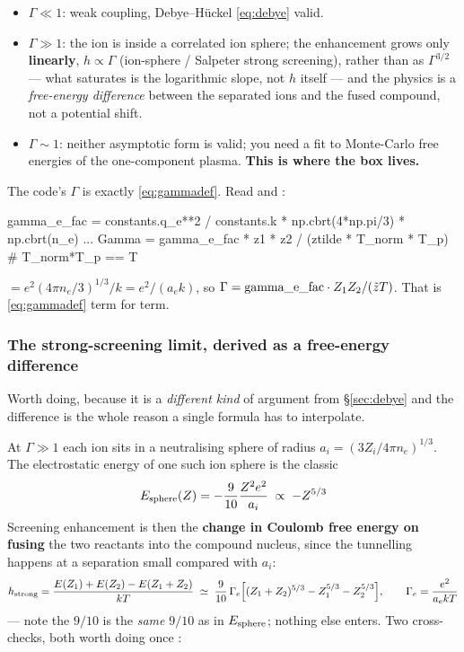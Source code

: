 \begin{itemize}
\item \textbf{$\Gamma \ll 1$}: weak coupling, Debye--H\"uckel \eqref{eq:debye}
      valid.
\item \textbf{$\Gamma \gg 1$}: the ion is inside a correlated ion sphere; the
      enhancement grows only \textbf{linearly}, $h \propto \Gamma$ (ion-sphere /
      Salpeter strong screening), rather than as $\Gamma^{3/2}$ --- what
      saturates is the logarithmic slope, not $h$ itself --- and the physics is a
      \emph{free-energy difference} between the separated ions and the fused
      compound, not a potential shift.
\item \textbf{$\Gamma \sim 1$}: neither asymptotic form is valid; you need a fit
      to Monte-Carlo free energies of the one-component plasma. \textbf{This is
      where the box lives.}
\end{itemize}

The code's $\Gamma$ is exactly \eqref{eq:gammadef}. Read
 and :

\begin{srclisting}
gamma_e_fac = constants.q_e**2 / constants.k * np.cbrt(4*np.pi/3) * np.cbrt(n_e)
...
Gamma = gamma_e_fac * z1 * z2 / (ztilde * T_norm * T_p)      # T_norm*T_p == T
\end{srclisting}

 $= e^2(4\pi n_e/3)^{1/3}/k = e^2/(a_e k)$, so
$\Gamma = \text{gamma\_e\_fac}\cdot Z_1Z_2/(\tilde z T)$. That is
\eqref{eq:gammadef} term for term.

\subsubsection{The strong-screening limit, derived as a free-energy difference}
\label{sec:strongscreening}

Worth doing, because it is a \emph{different kind} of argument from
\S\ref{sec:debye} and the difference is the whole reason a single formula has to
interpolate.

At $\Gamma \gg 1$ each ion sits in a neutralising sphere of radius
$a_i = (3Z_i/4\pi n_e)^{1/3}$. The electrostatic energy of one such ion sphere
is the classic \citep[eq.~28]{salpeter1954}
%
\begin{equation*}
E_{\rm sphere}(Z) = -\frac{9}{10}\frac{Z^2e^2}{a_i} \;\propto\; -Z^{5/3}
\end{equation*}
%
Screening enhancement is then the \textbf{change in Coulomb free energy on
fusing} the two reactants into the compound nucleus, since the tunnelling
happens at a separation small compared with $a_i$:
%
\begin{equation*}
h_{\rm strong} = \frac{E(Z_1)+E(Z_2)-E(Z_1+Z_2)}{kT}
\;\simeq\; \frac{9}{10}\,\Gamma_e\Bigl[(Z_1+Z_2)^{5/3}-Z_1^{5/3}-Z_2^{5/3}\Bigr],
\qquad \Gamma_e = \frac{e^2}{a_e kT}
\end{equation*}
%
--- note the $9/10$ is the \emph{same} $9/10$ as in $E_{\rm sphere}$; nothing
else enters. Two cross-checks, both worth doing once \derivedhere{}:

